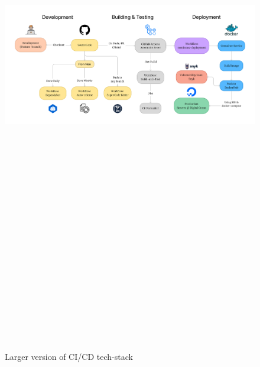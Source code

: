 \begin{figure}[H]
    \centering
    \includegraphics[angle=90, height=720pt]{Images/CICD_Chain.png} 
    \caption{Larger version of CI/CD tech-stack}
    \label{fig:Vertical CI/CD tech-stack}
\end{figure}
\newpage





